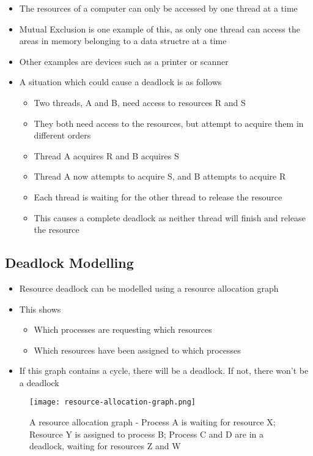 \begin{itemize}
  \item The resources of a computer can only be accessed by one thread at a time
  \item Mutual Exclusion is one example of this, as only one thread can access the areas in memory belonging to a data structre at a time
  \item Other examples are devices such as a printer or scanner
  \item A situation which could cause a deadlock is as follows
  \begin{itemize}
    \item Two threads, A and B, need access to resources R and S
    \item They both need access to the resources, but attempt to acquire them in different orders
    \item Thread A acquires R and B acquires S
    \item Thread A now attempts to acquire S, and B attempts to acquire R
    \item Each thread is waiting for the other thread to release the resource
    \item This causes a complete deadlock as neither thread will finish and release the resource
  \end{itemize}
\end{itemize}

\subsection*{Deadlock Modelling}

\begin{itemize}
  \item Resource deadlock can be modelled using a resource allocation graph
  \item This shows
  \begin{itemize}
    \item Which processes are requesting which resources
    \item Which resources have been assigned to which processes
  \end{itemize}
  \item If this graph contains a cycle, there will be a deadlock. If not, there won't be a deadlock
\end{itemize}

\begin{figure}[h]
  \centering
  \texttt{[image: resource-allocation-graph.png]}
  \caption{A resource allocation graph - Process A is waiting for resource X; Resource Y is assigned to process B; Process C and D are in a deadlock, waiting for resources Z and W}
\end{figure}

